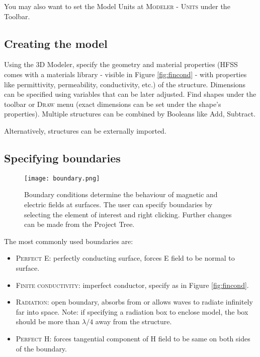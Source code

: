 \documentclass[11pt]{article}
\begin{document}
You may also want to set the Model Units at \textsc{Modeler - Units} under the Toolbar.


\subsection{Creating the model}

Using the 3D Modeler, specify the geometry and material properties (HFSS comes with a materials library - visible in Figure \ref{fig:fincond} - with properties like permittivity, permeability, conductivity, etc.) of the structure. Dimensions can be specified using variables that can be later adjusted. Find shapes under the toolbar or \textsc{Draw} menu (exact dimensions can be set under the shape's properties). Multiple structures can be combined by Booleans like Add, Subtract.

Alternatively, structures can be externally imported.


\subsection{Specifying boundaries}

\begin{figure}[H]
	\centering
	\texttt{[image: boundary.png]}
	\caption{Boundary conditions determine the behaviour of magnetic and electric fields at surfaces. The user can specify boundaries by selecting the element of interest and right clicking. Further changes can be made from the Project Tree.}
	\label{fig:boundary}
\end{figure}

The most commonly used boundaries are:
\begin{itemize}

	\item \textsc{Perfect E:} perfectly conducting surface, forces E field to be normal to surface.

	\item \textsc{Finite conductivity:} imperfect conductor, specify as in Figure \ref{fig:fincond}.

	\item \textsc{Radiation:} open boundary, absorbs from or allows waves to radiate infinitely far into space. Note: if specifying a radiation box to enclose model, the box should be more than $ \lambda / 4 $ away from the structure.

	\item \textsc{Perfect H:} forces tangential component of H field to be same on both sides of the boundary.

\end{itemize}
\end{document}
